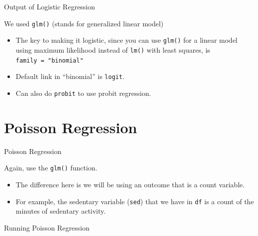 \begin{frame}[fragile]{Output of Logistic Regression}

\large

We used \texttt{glm()} (stands for generalized linear model)

\begin{itemize}
\tightlist
\item
  The key to making it logistic, since you can use \texttt{glm()} for a
  linear model using maximum likelihood instead of \texttt{lm()} with
  least squares, is \texttt{family\ =\ "binomial"}
\item
  Default link in ``binomial'' is \texttt{logit}.
\item
  Can also do \texttt{probit} to use probit regression.
\end{itemize}

\end{frame}

\section{Poisson Regression}\label{poisson-regression}

\begin{frame}[fragile]{Poisson Regression}

\large

Again, use the \texttt{glm()} function.

\begin{itemize}
\tightlist
\item
  The difference here is we will be using an outcome that is a count
  variable.
\item
  For example, the sedentary variable (\texttt{sed}) that we have in
  \texttt{df} is a count of the minutes of sedentary activity.
\end{itemize}

\end{frame}

\begin{frame}[fragile]{Running Poisson Regression}

\large

\begin{Shaded}
\begin{Highlighting}[]
\StringTok{ }\OperatorTok{~}\StringTok{ }\OperatorTok{+}\StringTok{ }\OperatorTok{+}\StringTok{ }
              \NormalTok{)}
\end{Highlighting}
\end{Shaded}

\end{frame}

